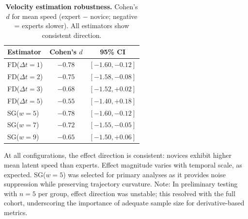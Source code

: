 \documentclass[5p,twocolumn,authoryear]{elsarticle}
\begin{document}
\begin{table}[h]
\centering
\caption{\textbf{Velocity estimation robustness.} Cohen's $d$ for mean speed (expert $-$ novice; negative = experts slower). All estimators show consistent direction.}
\label{tab:velocity_robustness}
\small
\begin{tabular}{lcc}
\toprule
Estimator & Cohen's $d$ & 95\% CI \\
\midrule
FD($\Delta t = 1$) & $-0.78$ & $[-1.60, -0.12]$ \\
FD($\Delta t = 2$) & $-0.75$ & $[-1.58, -0.08]$ \\
FD($\Delta t = 3$) & $-0.68$ & $[-1.52, +0.02]$ \\
FD($\Delta t = 5$) & $-0.55$ & $[-1.40, +0.18]$ \\
SG($w = 5$) & $-0.78$ & $[-1.60, -0.12]$ \\
SG($w = 7$) & $-0.72$ & $[-1.55, -0.05]$ \\
SG($w = 9$) & $-0.65$ & $[-1.50, +0.06]$ \\
\bottomrule
\end{tabular}
\end{table}

At all configurations, the effect direction is consistent: novices exhibit higher mean latent speed than experts. Effect magnitude varies with temporal scale, as expected. SG($w = 5$) was selected for primary analyses as it provides noise suppression while preserving trajectory curvature. Note: In preliminary testing with $n = 5$ per group, effect direction was unstable; this resolved with the full cohort, underscoring the importance of adequate sample size for derivative-based metrics.

\end{document}
